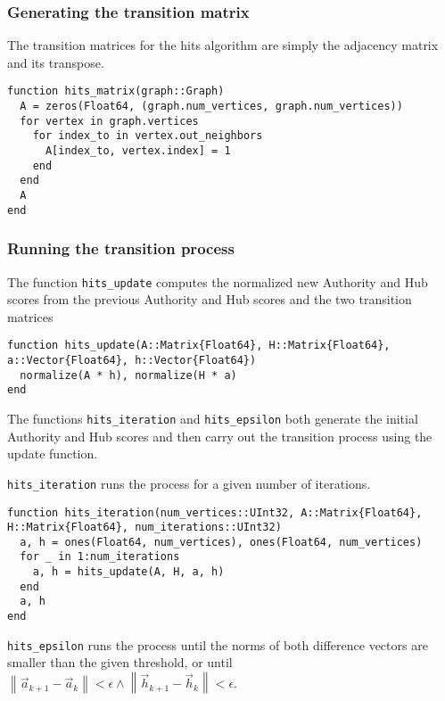 \documentclass[12pt, titlepage, twoside]{amsart}
\begin{document}
\subsubsection{Generating the transition matrix}

The transition matrices for the hits algorithm are simply the adjacency matrix and its transpose.

\begin{verbatim}
function hits_matrix(graph::Graph)
  A = zeros(Float64, (graph.num_vertices, graph.num_vertices))
  for vertex in graph.vertices
    for index_to in vertex.out_neighbors
      A[index_to, vertex.index] = 1
    end
  end
  A
end
\end{verbatim}

\subsubsection{Running the transition process}

The function \texttt{hits_update} computes the normalized new Authority and Hub scores from the
previous Authority and Hub scores and the two transition matrices

\begin{verbatim}
function hits_update(A::Matrix{Float64}, H::Matrix{Float64}, a::Vector{Float64}, h::Vector{Float64})
  normalize(A * h), normalize(H * a)
end
\end{verbatim}

The functions \texttt{hits_iteration} and \texttt{hits_epsilon}
both generate the initial Authority and Hub scores and then carry out the transition process using the update function.

\texttt{hits_iteration} runs the process for a given number of iterations.

\begin{verbatim}
function hits_iteration(num_vertices::UInt32, A::Matrix{Float64}, H::Matrix{Float64}, num_iterations::UInt32)
  a, h = ones(Float64, num_vertices), ones(Float64, num_vertices)
  for _ in 1:num_iterations
    a, h = hits_update(A, H, a, h)
  end
  a, h
end
\end{verbatim}

\texttt{hits_epsilon} runs the process until the norms of both difference vectors are smaller than 
the given threshold, or until
$\left\lVert
  \vec{a}_{k + 1} - \vec{a}_k
\right\rVert < \epsilon
\wedge
\left\lVert
  \vec{h}_{k + 1} - \vec{h}_k
\right\rVert < \epsilon$.
\end{document}
